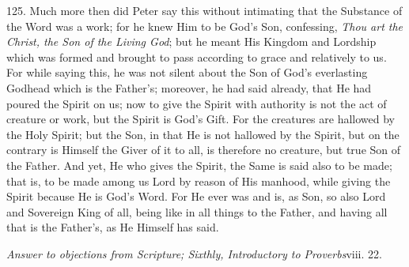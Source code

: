 125. Much more then did Peter
say this without intimating that the Substance of the Word was a work;
for he knew Him to be God's Son, confessing, \emph{Thou art the Christ,
the Son of the Living God}; but he meant His Kingdom and Lordship
which was formed and brought to pass according to grace and relatively
to us. For while saying this, he was not silent about the Son of God's
everlasting Godhead which is the Father's; moreover, he had said
already, that He had poured the Spirit on us; now to give the Spirit
with authority is not the act of creature or work, but the Spirit is
God's Gift. For the creatures are hallowed by the Holy Spirit; but the
Son, in that He is not hallowed by the Spirit, but on the contrary is
Himself the Giver of it to all, is therefore no creature, but true Son
of the Father. And yet, He who gives the Spirit, the Same is said also
to be made; that is, to be made among us Lord by reason of His
manhood, while giving the Spirit because He is God's Word. For He ever
was and is, as Son, so also Lord and Sovereign King of all, being like
in all things to the Father, and having all that is the Father's, as
He Himself has said.


\emph{Answer to
objections from Scripture; Sixthly, Introductory to Proverbs}viii.
22.

